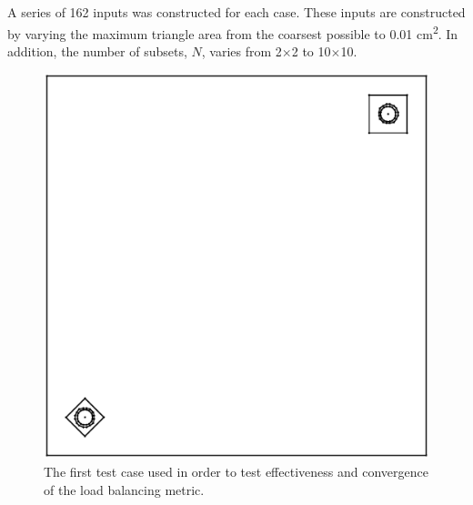 \documentclass{anstrans}
\begin{document}
A series of 162 inputs was constructed for each case. These inputs are constructed by varying the maximum triangle area from the coarsest possible to 0.01 cm\textsuperscript{2}. In addition, the number of subsets, $N$, varies from 2$\times$2 to 10$\times$10. 

\begin{figure}[H]
\centering
\includegraphics[scale = 0.5,trim = {0, 0, 0, 0}, clip]{figures/unbalanced_lattice.eps}
\caption{The first test case used in order to test effectiveness and convergence of the load balancing metric.}
\label{opp}
\end{figure}
\end{document}
